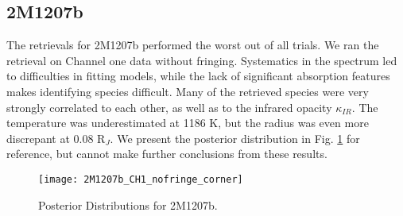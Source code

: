 \subsection{2M1207b}
The retrievals for 2M1207b performed the worst out of all trials.
We ran the retrieval on Channel one data without fringing.
Systematics in the spectrum led to difficulties in fitting models, while the lack of significant absorption features makes identifying species difficult.
Many of the retrieved species were very strongly correlated to each other, as well as to the infrared opacity $\kappa_{IR}$.
The temperature was underestimated at 1186 K, but the radius was even more discrepant at 0.08 R$_{J}$.
We present the posterior distribution in Fig. \ref{fig:post2M} for reference, but cannot make further conclusions from these results.
\begin{figure}[h]
	\texttt{[image: 2M1207b\_CH1\_nofringe\_corner]}
	\caption{Posterior Distributions for 2M1207b.}
	\label{fig:post2M}
\end{figure}
\clearpage
